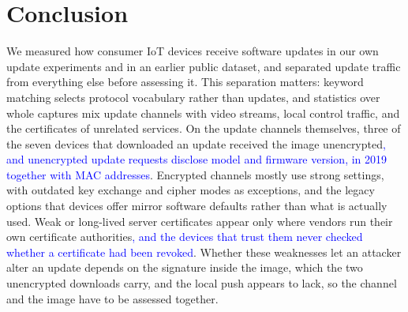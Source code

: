 
\section{Conclusion}
\label{sec:conclusion}
We measured how consumer IoT devices receive software updates in our own update experiments and in an earlier public dataset, and separated update traffic from everything else before assessing it.
This separation matters: keyword matching selects protocol vocabulary rather than updates, and statistics over whole captures mix update channels with video streams, local control traffic, and the certificates of unrelated services.
On the update channels themselves, three of the seven devices that downloaded an update received the image unencrypted\textcolor{blue}{, and unencrypted update requests disclose model and firmware version, in 2019 together with MAC addresses}.
Encrypted channels mostly use strong settings, with outdated key exchange and cipher modes as exceptions, and the legacy options that devices offer mirror software defaults rather than what is actually used.
Weak or long-lived server certificates appear only where vendors run their own certificate authorities\textcolor{blue}{, and the devices that trust them never checked whether a certificate had been revoked}.
Whether these weaknesses let an attacker alter an update depends on the signature inside the image, which the two unencrypted downloads carry, and the local push appears to lack, so the channel and the image have to be assessed together.








